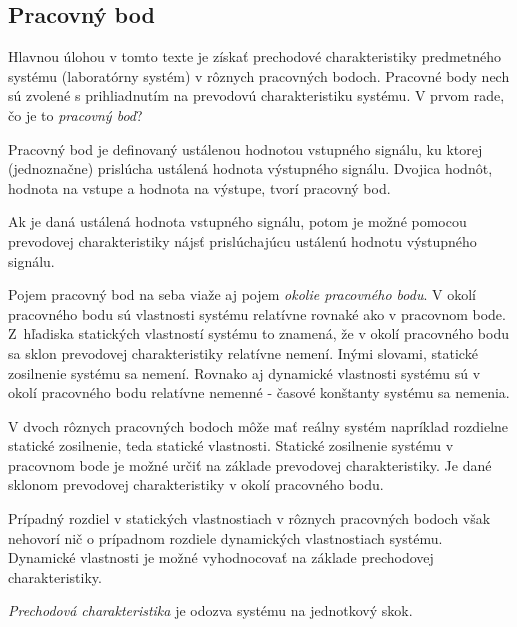 \documentclass[a4paper, 10pt, ]{article}
\begin{document}







\subsection{Pracovný bod}

Hlavnou úlohou v tomto texte je získať prechodové charakteristiky predmetného systému (laboratórny systém) v rôznych pracovných bodoch. Pracovné body nech sú zvolené s prihliadnutím na prevodovú charakteristiku systému. V prvom rade, čo je to \emph{pracovný bod}?

Pracovný bod je definovaný ustálenou hodnotou vstupného signálu, ku ktorej (jednoznačne) prislúcha ustálená hodnota výstupného signálu. Dvojica hodnôt, hodnota na vstupe a hodnota na výstupe, tvorí pracovný bod.

Ak je daná ustálená hodnota vstupného signálu, potom je možné pomocou prevodovej charakteristiky nájsť prislúchajúcu ustálenú hodnotu výstupného signálu.

Pojem pracovný bod na seba viaže aj pojem \emph{okolie pracovného bodu}. V okolí pracovného bodu sú vlastnosti systému relatívne rovnaké ako v pracovnom bode. Z~hľadiska statických vlastností systému to znamená, že v okolí pracovného bodu sa sklon prevodovej charakteristiky relatívne nemení. Inými slovami, statické zosilnenie systému sa nemení. Rovnako aj dynamické vlastnosti systému sú v okolí pracovného bodu relatívne nemenné - časové konštanty systému sa nemenia.

V dvoch rôznych pracovných bodoch môže mať reálny systém napríklad rozdielne statické zosilnenie, teda statické vlastnosti. Statické zosilnenie systému v pracovnom bode je možné určiť na základe prevodovej charakteristiky. Je dané sklonom prevodovej charakteristiky v okolí pracovného bodu.

Prípadný rozdiel v statických vlastnostiach v rôznych pracovných bodoch však nehovorí nič o prípadnom rozdiele dynamických vlastnostiach systému. Dynamické vlastnosti je možné vyhodnocovať na základe prechodovej charakteristiky.

\emph{Prechodová charakteristika} je odozva systému na jednotkový skok.
\end{document}
